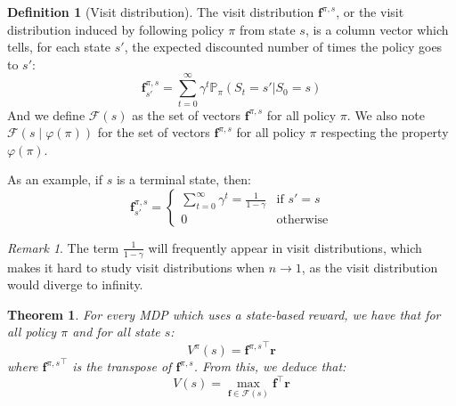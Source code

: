 \documentclass{article}
\newtheorem{theorem}{Theorem}[section]
\theoremstyle{definition}
\newtheorem{definition}{Definition}[section]
\theoremstyle{remark}
\newtheorem*{remark}{Remark}
\theoremstyle{example}
\newcommand*{\rf}{\mathbf{r}}           %
\newcommand*{\f}{\mathbf{f}}            %
\newcommand*{\F}{\mathcal{F}}
\begin{document}
\begin{definition}[Visit distribution]
		The visit distribution $\f^{\pi,s}$, or the visit distribution induced by following policy $\pi$ from state $s$, is a column vector which tells, for each state $s'$, the expected discounted number of times the policy goes to $s'$:
				$$\f^{\pi,s}_{s'} = \sum_{t=0}^\infty \gamma^t \mathbb{P}_\pi(S_t = s' | S_0 = s)$$
		And we define $\mathcal{F}(s)$ as the set of vectors $\f^{\pi,s}$ for all policy $\pi$. We also note $\mathcal{F}(s \mid \varphi(\pi))$ for the set of vectors $\f^{\pi,s}$ for all policy $\pi$ respecting the property $\varphi(\pi)$.
\end{definition}

As an example, if $s$ is a terminal state, then:
				$$\f^{\pi,s}_{s'} = \begin{cases} \sum_{t=0}^\infty \gamma^t = \frac{1}{1 - \gamma} & \text{if } s' = s\\ 0 & \text{otherwise} \end{cases}$$

\begin{remark}
		The term $\frac{1}{1 - \gamma}$ will frequently appear in visit distributions, which makes it hard to study visit distributions when $n \rightarrow 1$, as the visit distribution would diverge to infinity.
\end{remark}

\begin{theorem}
		For every MDP which uses a state-based reward, we have that for all policy $\pi$ and for all state $s$:
				$$V^\pi(s) = {\f^{\pi,s}}^\top \rf$$
		where ${\f^{\pi,s}}^\top$ is the transpose of $\f^{\pi,s}$. From this, we deduce that:
				$$V(s) = \max_{\f \in \F(s)} \f^\top \rf$$
\end{theorem}
\end{document}
